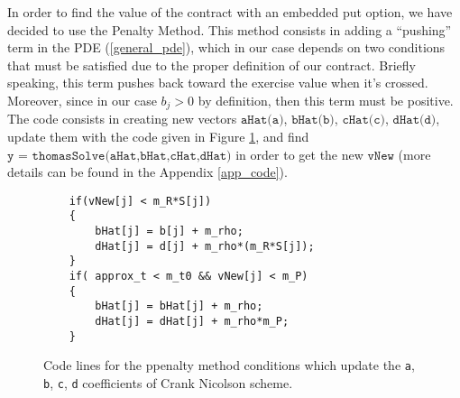 In order to find the value of the contract with an embedded put option, we have decided to use the Penalty Method. This method consists in adding a ``pushing'' term in the PDE (\ref{general_pde}), which in our case depends on two conditions that must be satisfied due to the proper definition of our contract. Briefly speaking, this term pushes back toward the exercise value when it's crossed. Moreover, since in our case $b_j > 0$ by definition, then this term must be positive. The code consists in creating new vectors $\texttt{aHat(a)}$, $\texttt{bHat(b)}$, $\texttt{cHat(c)}$, $\texttt{dHat(d)}$, update them with the code given in Figure \ref{codePenalty}, and find $\texttt{y = thomasSolve(aHat,bHat,cHat,dHat)}$ in order to get the new $\texttt{vNew}$ (more details can be found in the Appendix \ref{app_code}).
\vspace{-0.5cm}
\begin{figure}[h!]
\begin{lstlisting}
	if(vNew[j] < m_R*S[j])
	{
		bHat[j] = b[j] + m_rho;
		dHat[j] = d[j] + m_rho*(m_R*S[j]);
	}
	if( approx_t < m_t0 && vNew[j] < m_P)
	{
		bHat[j] = bHat[j] + m_rho;
		dHat[j] = dHat[j] + m_rho*m_P;
	}
\end{lstlisting}
\captionsetup{width=.6\linewidth}
\caption{Code lines for the ppenalty method conditions which update the \texttt{a}, \texttt{b}, \texttt{c}, \texttt{d} coefficients of Crank Nicolson scheme.}\label{codePenalty}
\end{figure}
